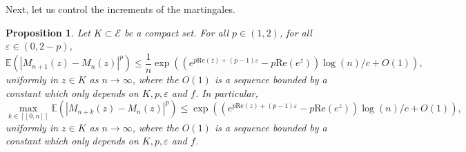 \documentclass[11pt]{article}
\newtheorem{proposition}[theorem]{Proposition}
\numberwithin{equation}{section}
\def\vp{\varepsilon}
\def\E{\mathbb{E}}
\def\lb{[\![}
\def\rb{]\!]}
\renewcommand{\Re}{\mathrm{Re}}
\begin{document}
Next, let us control the increments of the martingales.
\begin{proposition}\label{prop controle increments martingale}
	Let $K \subset \mathcal{E}$ be a compact set. For all $p \in (1,2)$, for all $\vp \in (0,2-p)$,
	\[
	\E\left( \left\vert M_{n+1}(z)- M_n(z)\right\vert^p\right)\le \frac{1}{n}
	\exp\left( \left(e^{p \Re(z) +(p-1)\vp}-p\Re(e^z)\right) \log (n)/c + O(1)\right),
	\]
	uniformly in $z \in K$ as $n\to \infty$, where the $O(1)$ is a sequence bounded by a constant which only depends on $K, p, \vp$ and $f$. In particular, 
	\[
	\max_{k \in \lb 0, n \rb} \E\left( \left\vert M_{n+k}(z)- M_n(z)\right\vert^p\right)\le 
	\exp\left( \left(e^{p \Re(z) +(p-1)\vp}-p\Re(e^z)\right) \log (n)/c + O(1)\right),
	\]
	uniformly in $z \in K$ as $n\to \infty$, where the $O(1)$ is a sequence bounded by a constant which only depends on $K, p, \vp$ and $f$. 
\end{proposition}
\end{document}

